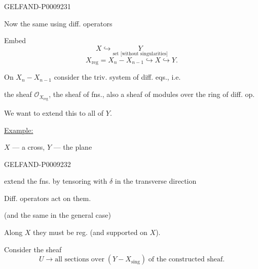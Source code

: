 \begin{GelfandAdjacentEvidence}{GELFAND-P000923}{1}

Now the same using diff. operators

Embed
\[
 X\hookrightarrow\underset{\text{set [without singularities]}}{Y}
\]
\begin{equation*}
 X_{\mathrm{reg}}=X_n-X_{n-1}\hookrightarrow X\hookrightarrow Y.
 \tag{4}
\end{equation*}

On $X_n-X_{n-1}$ consider the triv. system of diff. eqs., i.e.

the sheaf $\mathcal O_{X_{\mathrm{reg}}}$, the sheaf of fns., also a sheaf of modules over the ring of diff. op.

We want to extend this to all of $Y$.

\underline{Example:}

$X$ --- a cross, \qquad $Y$ --- the plane
\end{GelfandAdjacentEvidence}
\begin{GelfandAdjacentEvidence}{GELFAND-P000923}{2}


extend the fns. by tensoring with $\delta$ in the transverse direction

Diff. operators act on them.

(and the same in the general case)

Along $X$ they must be reg. (and supported on $X$).

Consider the sheaf
\begin{equation*}
 U\longrightarrow\text{all sections over}\;(Y-X_{\mathrm{sing}})\;\text{of the constructed sheaf}.
\end{equation*}
\end{GelfandAdjacentEvidence}

